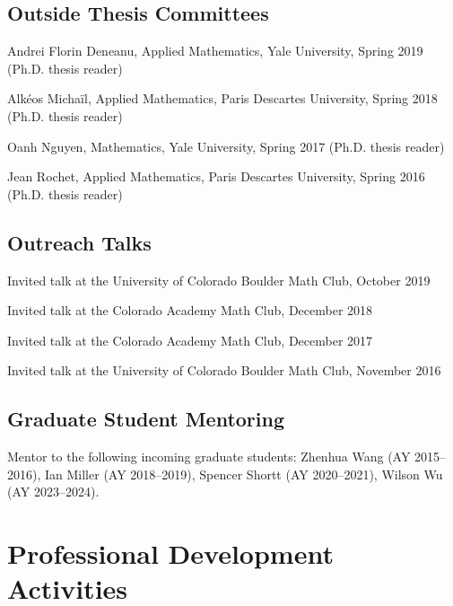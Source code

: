 \documentclass[letterpaper]{article}
\renewenvironment{itemize}{
  \begin{list}{}{
    \setlength{\leftmargin}{1em}
  }
}{
  \end{list}
}
\begin{document}
\subsection*{Outside Thesis Committees}
\begin{itemize}
	\item Andrei Florin Deneanu, Applied Mathematics, Yale University, Spring 2019 (Ph.D. thesis reader)
	\item  Alk\'{e}os Micha\"{i}l, Applied Mathematics, Paris Descartes University, Spring 2018 (Ph.D. thesis reader)
	\item Oanh Nguyen, Mathematics, Yale University, Spring 2017 (Ph.D. thesis reader)
	\item Jean Rochet, Applied Mathematics, Paris Descartes University, Spring 2016 (Ph.D. thesis reader)
\end{itemize}

\subsection*{Outreach Talks} 
\begin{itemize}
\item Invited talk at the University of Colorado Boulder Math Club, October 2019
\item Invited talk at the Colorado Academy Math Club, December 2018
\item Invited talk at the Colorado Academy Math Club, December 2017
\item Invited talk at the University of Colorado Boulder Math Club, November 2016
\end{itemize}

\subsection*{Graduate Student Mentoring}
\begin{itemize}
\item Mentor to the following incoming graduate students: Zhenhua Wang (AY 2015--2016), Ian Miller (AY 2018--2019), Spencer Shortt (AY 2020--2021), Wilson Wu (AY 2023--2024).  
\end{itemize}

\section*{Professional Development Activities}
\end{document}
